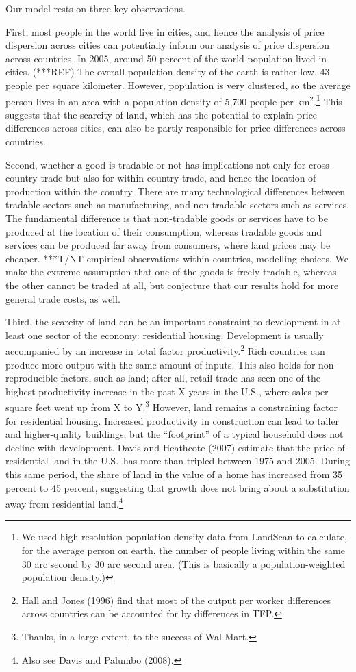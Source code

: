 \documentclass[12pt]{article}
\begin{document}
Our model rests on three key observations.

First, most people in the world live in cities, and hence the analysis of price dispersion across cities can potentially inform our analysis of price dispersion across countries. In 2005, around 50 percent of the world population lived in cities. (***REF) The overall population density of the earth is rather low, 43 people per square kilometer.  However, population is very clustered, so the average person lives in an area with a population density of 5,700 people per km${}^2$.\footnote{We used high-resolution population density data from LandScan to calculate, for the average person on earth, the number of people living within the same 30 arc second by 30 arc second area. (This is basically a population-weighted population density.) } This suggests that the scarcity of land, which has the potential to explain price differences across cities, can also be partly responsible for price differences across countries.

Second, whether a good is tradable or not has implications not only for cross-country trade but also for within-country trade, and hence the location of production within the country. There are many technological differences between tradable sectors such as manufacturing, and non-tradable sectors such as services. The fundamental difference is that non-tradable goods or services have to be produced at the location of their consumption, whereas tradable goods and services can be produced far away from consumers, where land prices may be cheaper. ***T/NT empirical observations within countries, modelling choices.  We make the extreme assumption that one of the goods is freely tradable, whereas the other cannot be traded at all, but conjecture that our results hold for more general trade costs, as well.

Third, the scarcity of land can be an important constraint to development in at least one sector of the economy: residential housing. Development is usually accompanied by an increase in total factor productivity.\footnote{Hall and Jones (1996) find that most of the output per worker differences across countries can be accounted for by differences in TFP.} Rich countries can produce more output with the same amount of inputs. This also holds for non-reproducible factors, such as land; after all, retail trade has seen one of the highest productivity increase in the past X years in the U.S., where sales per square feet went up from X to Y.\footnote{Thanks, in a large extent, to the success of Wal Mart.} However, land remains a constraining factor for residential housing. Increased productivity in construction can lead to taller and higher-quality buildings, but the ``footprint'' of a typical household does not decline with development. Davis and Heathcote (2007) estimate that the price of residential land in the U.S.~has more than tripled between 1975 and 2005. During this same period, the share of land in the value of a home has increased from 35 percent to 45 percent, suggesting that growth does not bring about a substitution away from residential land.\footnote{Also see Davis and Palumbo (2008).}
\end{document}
